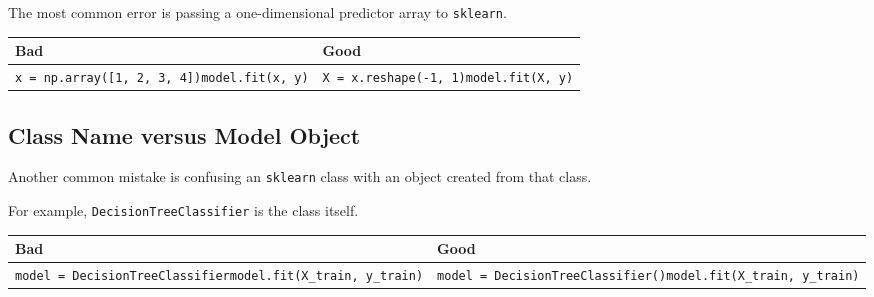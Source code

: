 \documentclass[
  letterpaper,
  DIV=11,
  numbers=noendperiod]{scrreprt}
\newcounter{none} %
\theoremstyle{definition}
\theoremstyle{definition}
\theoremstyle{plain}
\theoremstyle{plain}
\theoremstyle{remark}
\begin{document}
The most common error is passing a one-dimensional predictor array to
\texttt{sklearn}.

{\def\LTcaptype{none} %
\begin{longtable}[]{@{}
  >{\raggedright\arraybackslash}p{}
  >{\raggedright\arraybackslash}p{}@{}}
\toprule\noalign{}
\begin{minipage}[b]{\linewidth}\raggedright
Bad
\end{minipage} & \begin{minipage}[b]{\linewidth}\raggedright
Good
\end{minipage} \\
\midrule\noalign{}
\endhead
\bottomrule\noalign{}
\endlastfoot
\texttt{x\ =\ np.array({[}1,\ 2,\ 3,\ 4{]})}\texttt{model.fit(x,\ y)} &
\texttt{X\ =\ x.reshape(-1,\ 1)}\texttt{model.fit(X,\ y)} \\
\end{longtable}
}

\subsection{Class Name versus Model
Object}\label{class-name-versus-model-object}

Another common mistake is confusing an \texttt{sklearn} class with an
object created from that class.

For example, \texttt{DecisionTreeClassifier} is the class itself.

{\def\LTcaptype{none} %
\begin{longtable}[]{@{}
  >{\raggedright\arraybackslash}p{}
  >{\raggedright\arraybackslash}p{}@{}}
\toprule\noalign{}
\begin{minipage}[b]{\linewidth}\raggedright
Bad
\end{minipage} & \begin{minipage}[b]{\linewidth}\raggedright
Good
\end{minipage} \\
\midrule\noalign{}
\endhead
\bottomrule\noalign{}
\endlastfoot
\texttt{model\ =\ DecisionTreeClassifier}\texttt{model.fit(X\_train,\ y\_train)}
&
\texttt{model\ =\ DecisionTreeClassifier()}\texttt{model.fit(X\_train,\ y\_train)} \\
\end{longtable}
}
\end{document}
